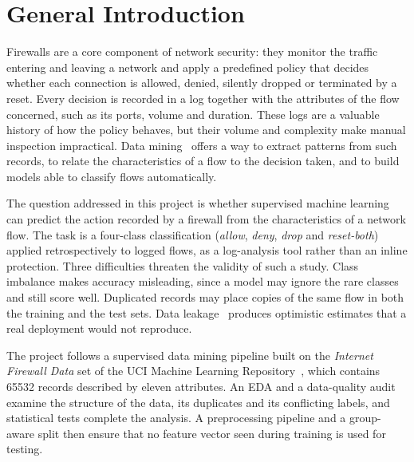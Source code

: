 \chapter*{General Introduction}
\setcounter{page}{1}


Firewalls are a core component of network security: they monitor the traffic entering and leaving a network and apply a predefined policy that decides whether each connection is allowed, denied, silently dropped or terminated by a reset. Every decision is recorded in a log together with the attributes of the flow concerned, such as its ports, volume and duration. These logs are a valuable history of how the policy behaves, but their volume and complexity make manual inspection impractical. Data mining~\cite{fayyad1996data} offers a way to extract patterns from such records, to relate the characteristics of a flow to the decision taken, and to build models able to classify flows automatically.

The question addressed in this project is whether supervised machine learning can predict the action recorded by a firewall from the characteristics of a network flow. The task is a four-class classification (\emph{allow}, \emph{deny}, \emph{drop} and \emph{reset-both}) applied retrospectively to logged flows, as a log-analysis tool rather than an inline protection. Three difficulties threaten the validity of such a study. Class imbalance makes accuracy misleading, since a model may ignore the rare classes and still score well. Duplicated records may place copies of the same flow in both the training and the test sets. Data leakage~\cite{kaufman2012leakage} produces optimistic estimates that a real deployment would not reproduce.

The project follows a supervised data mining pipeline built on the \emph{Internet Firewall Data} set of the \ac{UCI} Machine Learning Repository~\cite{dua2019uci}, which contains \num{65532} records described by eleven attributes. An \ac{EDA} and a data-quality audit examine the structure of the data, its duplicates and its conflicting labels, and statistical tests complete the analysis. A preprocessing pipeline and a group-aware split then ensure that no feature vector seen during training is used for testing.

